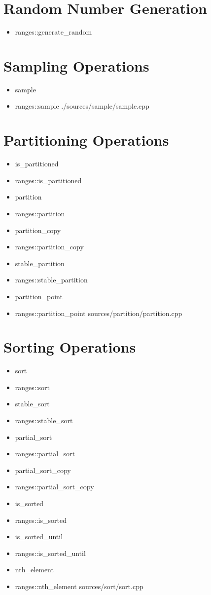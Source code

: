 \documentclass{article}
\begin{document}
\section{Random Number Generation}
    \begin{itemize}
      \item ranges::generate\_random
    \end{itemize}
\section{Sampling Operations}
    \begin{itemize}
      \item sample
      \item ranges::sample
         {./sources/sample/sample.cpp}
    \end{itemize}
\section{Partitioning Operations}
    \begin{itemize}
      \item is\_partitioned
      \item ranges::is\_partitioned
      \item partition
      \item ranges::partition
      \item partition\_copy
      \item ranges::partition\_copy
      \item stable\_partition
      \item ranges::stable\_partition
      \item partition\_point
      \item ranges::partition\_point
         {sources/partition/partition.cpp}
    \end{itemize}
\section{Sorting Operations}
    \begin{itemize}
      \item sort
      \item ranges::sort
      \item stable\_sort
      \item ranges::stable\_sort
      \item partial\_sort
      \item ranges::partial\_sort
      \item partial\_sort\_copy
      \item ranges::partial\_sort\_copy
      \item is\_sorted
      \item ranges::is\_sorted
      \item is\_sorted\_until
      \item ranges::is\_sorted\_until
      \item nth\_element
      \item ranges::nth\_element
         {sources/sort/sort.cpp}
    \end{itemize}
\end{document}
